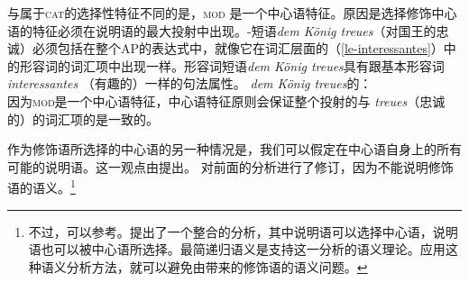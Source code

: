 与属于\textsc{cat}的选择性特征\subcat 不同的是，\textsc{mod} 是一个中心语特征。原因是选择修饰中心语的特征必须在说明语的最大投射中出现。\nbar{}-短语\emph{dem König treues}（对国王的忠诚）必须包括在整个AP的表达式中，就像它在词汇层面的（\ref{le-interessantes}）中的形容词的词汇项中出现一样。形容词短语\emph{dem König treues}具有跟基本形容词\emph{interessantes} （有趣的）一样的句法属性。
\ea
\label{avm-dem-koenig-treues}
\emph{dem König treues}的\catv ：\\
\z
因为\textsc{mod}是一个中心语特征，中心语特征原则会保证整个投射的\modv 与 \emph{treues}（忠诚的）的词汇项的\modv 是一致的。

作为修饰语所选择的中心语的另一种情况是，我们可以假定在中心语自身上的所有可能的说明语。这一观点由\citet[]{ps}提出。\citet[Section~1.9]{ps2} 对前面的分析进行了修订，因为不能说明修饰语的语义。\footnote{
不过，可以参考。提出了一个整合的分析，其中说明语可以选择中心语，说明语也可以被中心语所选择。最简递归语义\indexmrs 是支持这一分析的语义理论。应用这种语义分析方法，就可以避免由\citet*{ps}带来的修饰语的语义问题。
}

